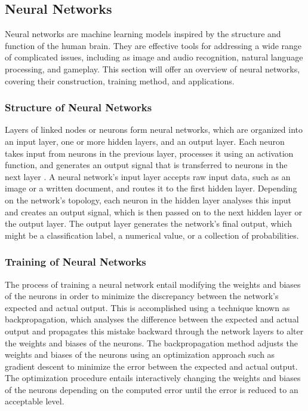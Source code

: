 \documentclass[12pt,oneside]{article}
\begin{document}
\subsection{Neural Networks}
Neural networks are machine learning models inspired by the structure and function of the human brain. They are effective tools for addressing a wide range of complicated issues, including as image and audio recognition, natural language processing, and gameplay. This section will offer an overview of neural networks, covering their construction, training method, and applications.

\subsubsection{Structure of Neural Networks}
Layers of linked nodes or neurons form neural networks, which are organized into an input layer, one or more hidden layers, and an output layer. Each neuron takes input from neurons in the previous layer, processes it using an activation function, and generates an output signal that is transferred to neurons in the next layer \cite{43_hamdia2021efficient}.
A neural network's input layer accepts raw input data, such as an image or a written document, and routes it to the first hidden layer. Depending on the network's topology, each neuron in the hidden layer analyses this input and creates an output signal, which is then passed on to the next hidden layer or the output layer. The output layer generates the network's final output, which might be a classification label, a numerical value, or a collection of probabilities.

\subsubsection{Training of Neural Networks}
The process of training a neural network entail modifying the weights and biases of the neurons in order to minimize the discrepancy between the network's expected and actual output. This is accomplished using a technique known as backpropagation, which analyses the difference between the expected and actual output and propagates this mistake backward through the network layers to alter the weights and biases of the neurons.
The backpropagation method adjusts the weights and biases of the neurons using an optimization approach such as gradient descent to minimize the error between the expected and actual output. The optimization procedure entails interactively changing the weights and biases of the neurons depending on the computed error until the error is reduced to an acceptable level.
\end{document}
